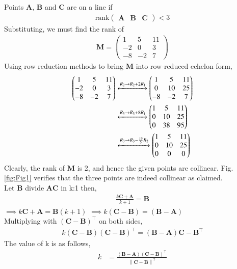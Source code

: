 \documentclass[12pt]{article}
\let\vec\mathbf
\providecommand{\brak}[1]{\ensuremath{\left(#1\right)}}
\providecommand{\norm}[1]{\left\lVert#1\right\rVert}
\newcommand{\myvec}[1]{\ensuremath{\begin{pmatrix}#1\end{pmatrix}}}
\let\vec\mathbf
\begin{document}
\begin{enumerate}
		Points $\vec{A}$, $\vec{B}$ and $\vec{C}$ are on a line if
    \begin{align}
        \textrm{rank}\myvec{\vec{A} & \vec{B} & \vec{C}} < 3
        \label{eq:chapters/12/10/5/8rank-collinear}
    \end{align}
    Substituting, we must find the rank of
    \begin{align}
        \vec{M} = \myvec{1&5&11\\-2&0&3\\-8&-2&7}
    \end{align}
    Using row reduction methods to bring $\vec{M}$ into row-reduced echelon form,
    \begin{align}
        \myvec{1&5&11\\-2&0&3\\-8&-2&7}&\xleftrightarrow[]{R_2\rightarrow R_2+2R_1}
        \myvec{1&5&11\\0&10&25\\-8&-2&7} \\
                &\xleftrightarrow[]{R_3\rightarrow R_3+8R_1}\myvec{1&5&11\\0&10&25\\0&38&95} \\
                &\xleftrightarrow[]{R_3\rightarrow R_3-\frac{19}{5}R_2}\myvec{1&5&11\\0&10&25\\0&0&0}
                \label{eq:chapters/12/10/5/8row-red}
    \end{align}
    Clearly, the rank of $\vec{M}$ is 2, and hence the given points are 
    collinear. 
    Fig. \ref{fig:Fig1}  verifies that the three points are indeed 
    collinear as claimed.\\
	Let $\vec{B}$ divide $\vec{AC}$ in k:1 then,
	\begin{align}
		\frac{k\vec{C}+\vec{A}}{k+1} = \vec{B}
	\end{align}
		$\implies k\vec{C}+\vec{A}=\vec{B}\brak{k+1}$
		$\implies k\brak{\vec{C}-\vec{B}}=\brak{\vec{B}-\vec{A}}$\\ 
		Multiplying with $\brak{\vec{C}-\vec{B}}^{\top}$ on both sides,
		\begin{align*}
			 k\brak{\vec{C}-\vec{B}}\brak{\vec{C}-\vec{B}}^{\top}=\brak{\vec{B}-\vec{A}}{\vec{C}-\vec{B}}^{\top}
		\end{align*}
			The value of k is as follows,
			\begin{align}
			k &=
			\frac{\brak{\vec{B}-\vec{A}}\brak{\vec{C}-\vec{B}}^{\top}}{\norm{\vec{C-B}}^2}
			\label{eq:7}
			\end{align}


\end{enumerate}
\end{document}

